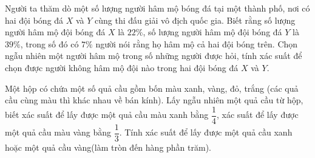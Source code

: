 \begin{ex}%
	Người ta thăm dò một số lượng người hâm mộ bóng đá tại một thành phố, nơi có hai đội bóng đá $X$ và $Y$ cùng thi đấu giải vô địch quốc gia. Biết rằng số lượng người hâm mộ đội bóng đá $X$ là $22\%$, số lượng người hâm mộ đội bóng đá $Y$ là $39\%$, trong số đó có $7\%$ người nói rằng họ hâm mộ cả hai đội bóng trên. Chọn ngẫu nhiên một người hâm mộ trong số những người được hỏi, tính xác suất để chọn được người không hâm mộ đội nào trong hai đội bóng đá $X$ và $Y$.
\end{ex}

\begin{ex}%
	Một hộp có chứa một số quả cầu gồm bốn màu xanh, vàng, đỏ, trắng (các quả cầu cùng màu thì khác nhau về bán kính). Lấy ngẫu nhiên một quả cầu từ hộp, biết xác suất để lấy được một quả cầu màu xanh bằng $\dfrac{1}{4}$, xác suất để lấy được một quả cầu màu vàng bằng $\dfrac{1}{3}$. Tính xác suất để lấy được một quả cầu xanh hoặc một quả cầu vàng(làm tròn đến hàng phần trăm).
\end{ex}

